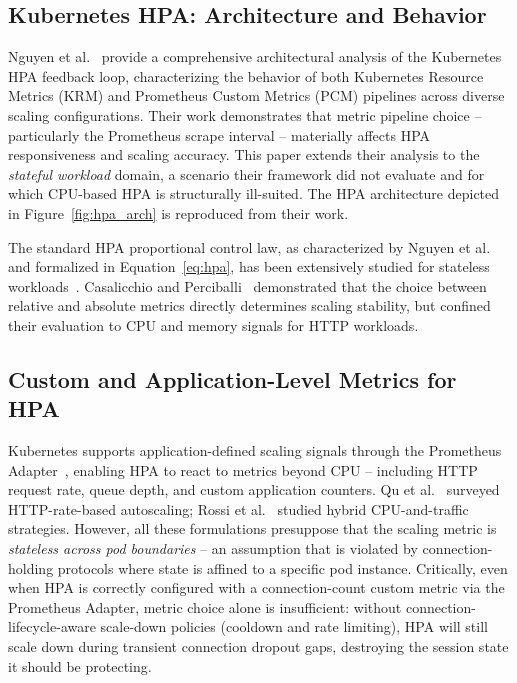 \documentclass[twocolumn]{svjour3}
\begin{document}
\subsection{Kubernetes HPA: Architecture and Behavior}

Nguyen et al.~\cite{nguyen2020hpa} provide a comprehensive architectural analysis of the Kubernetes HPA feedback loop, characterizing the behavior of both Kubernetes Resource Metrics (KRM) and Prometheus Custom Metrics (PCM) pipelines across diverse scaling configurations. Their work demonstrates that metric pipeline choice -- particularly the Prometheus scrape interval -- materially affects HPA responsiveness and scaling accuracy. This paper extends their analysis to the \textit{stateful workload} domain, a scenario their framework did not evaluate and for which CPU-based HPA is structurally ill-suited. The HPA architecture depicted in Figure~\ref{fig:hpa_arch} is reproduced from their work.

The standard HPA proportional control law, as characterized by Nguyen et al.~\cite{nguyen2020hpa} and formalized in Equation~\ref{eq:hpa}, has been extensively studied for stateless workloads~\cite{casalicchio2019auto,lorido2014auto}. Casalicchio and Perciballi~\cite{casalicchio2019auto} demonstrated that the choice between relative and absolute metrics directly determines scaling stability, but confined their evaluation to CPU and memory signals for HTTP workloads.

\subsection{Custom and Application-Level Metrics for HPA}

Kubernetes supports application-defined scaling signals through the Prometheus Adapter~\cite{prometheus_adapter}, enabling HPA to react to metrics beyond CPU -- including HTTP request rate, queue depth, and custom application counters. Qu et al.~\cite{qu2018auto} surveyed HTTP-rate-based autoscaling; Rossi et al.~\cite{rossi2020horizontal} studied hybrid CPU-and-traffic strategies. However, all these formulations presuppose that the scaling metric is \textit{stateless across pod boundaries} -- an assumption that is violated by connection-holding protocols where state is affined to a specific pod instance. Critically, even when HPA is correctly configured with a connection-count custom metric via the Prometheus Adapter, metric choice alone is insufficient: without connection-lifecycle-aware scale-down policies (cooldown and rate limiting), HPA will still scale down during transient connection dropout gaps, destroying the session state it should be protecting.
\end{document}
